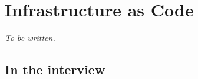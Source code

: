 \chapter{Infrastructure as Code}
\label{ch:iac}


\emph{To be written.}

\section*{In the interview}

